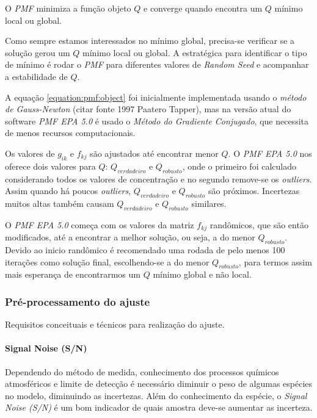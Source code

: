 O \textit{PMF} minimiza a função objeto $Q$ e converge quando encontra um $Q$ 
mínimo local ou global. 

Como sempre estamos interessados no mínimo global, precisa-se verificar se a 
solução gerou um $Q$ mínimo local ou global. A estratégica para identificar
o tipo de mínimo é rodar o \textit{PMF} para diferentes valores de 
\textit{Random Seed} e acompanhar a estabilidade de $Q$.

A equação \ref{equation:pmf:object} foi inicialmente implementada usando 
o \textit{método de Gauss-Newton}  (citar fonte 1997 Paatero Tapper), mas na 
versão atual do software \textit{PMF EPA 5.0} é usado o 
\textit{Método do Gradiente Conjugado}, que necessita de menos recursos 
computacionais. 

Os valores de $g_{ik}$ e $f_{kj}$ são ajustados até encontrar menor $Q$. 
O \textit{PMF EPA 5.0} nos oferece dois valores para $Q$: $Q_{verdadeiro}$ e 
$Q_{robusto}$, onde o primeiro foi calculado considerando todos os valores 
de concentração e no segundo remove-se os \textit{outliers}.
Assim quando há poucos \textit{outliers}, $Q_{verdadeiro}$ e $Q_{robusto}$ 
são próximos. Incertezas muitos altas também causam $Q_{verdadeiro}$ e 
$Q_{robusto}$ similares.

O \textit{PMF EPA 5.0} começa com os valores da matriz $f_{kj}$ randômicos, 
que são então modificados, até a encontrar a melhor solução, ou seja, 
a do menor $Q_{robusto}$. 
Devido ao inicio randômico é recomendado uma rodada de pelo menos 100 iterações 
como solução final, escolhendo-se a do menor $Q_{robusto}$, para termos assim 
mais esperança de encontrarmos um $Q$ mínimo global e não local.

\subsubsection{Pré-processamento do ajuste}
Requisitos conceituais e técnicos para realização do ajuste.

\paragraph{Signal Noise (S/N)}

Dependendo do método de medida, conhecimento dos processos químicos 
atmosféricos e limite de detecção é necessário diminuir o peso de algumas 
espécies no modelo, diminuindo as incertezas. 
Além do conhecimento da espécie, o \textit{Signal Noise (S/N)} é um bom 
indicador de quais amostra deve-se aumentar as incerteza.


